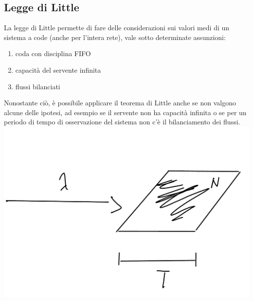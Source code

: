 \documentclass{article}
\begin{document}
\subsection{Legge di Little}\label{Little}
La legge di Little permette di fare delle considerazioni sui valori medi di un sistema a code (anche per l'intera rete), vale sotto determinate assunzioni:
\begin{enumerate}
\item coda con disciplina FIFO
\item capacità del servente infinita
\item flussi bilanciati
\end{enumerate}
Nonostante ciò, è possibile applicare il teorema di Little anche se non valgono alcune delle ipotesi, ad esempio se il servente non ha capacità infinita o se per un periodo di tempo di osservazione del sistema non c'è il bilanciamento dei flussi.\\
\includegraphics[scale=0.3]{images/PMCSN-903-1.jpeg}\\
\end{document}
